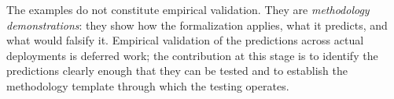The examples do not constitute empirical validation.  They are
\emph{methodology demonstrations}: they show how the formalization
applies, what it predicts, and what would falsify it.  Empirical
validation of the predictions across actual deployments is
deferred work; the contribution at this stage is to identify the
predictions clearly enough that they can be tested and to
establish the methodology template through which the testing
operates.
